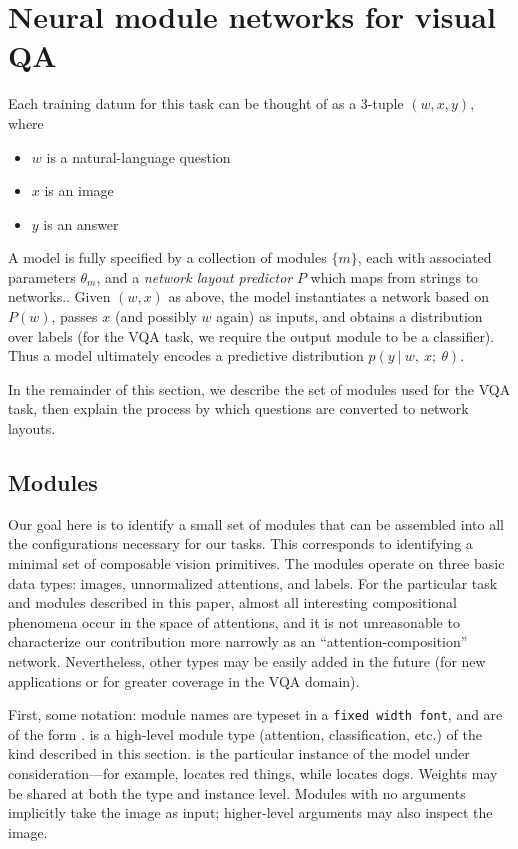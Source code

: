 
\section{Neural module networks for visual QA}
\label{sec:model}

Each training datum for this task can be thought of as a 3-tuple $(w, x, y)$, where
\begin{itemize}
  \setlength\itemsep{0em}
  \item $w$ is a natural-language question
  \item $x$ is an image
  \item $y$ is an answer
\end{itemize}
A model is fully specified by a collection of modules $\{ m \}$, each with
associated parameters $\theta_m$, and a \emph{network layout predictor} $P$
which maps from strings to networks.. Given $(w, x)$ as above, the model
instantiates a network based on $P(w)$, passes $x$ (and possibly $w$ again) as
inputs, and obtains a distribution over labels (for the VQA task, we require the
output module to be a classifier). Thus a model ultimately encodes a predictive
distribution $p(y\ |\ w,\ x;\ \theta)$.

In the remainder of this section, we describe the set of modules used for the
VQA task, then explain the process by which questions are converted to network
layouts.

\subsection{Modules}

Our goal here is to identify a small set of modules that can be assembled into
all the configurations necessary for our tasks. This corresponds to identifying
a minimal set of composable vision primitives. The modules operate on three
basic data types: images, unnormalized attentions, and labels.  For the
particular task and modules described in this paper, almost all interesting
compositional phenomena occur in the space of attentions, and it is not
unreasonable to characterize our contribution more narrowly as an
``attention-composition'' network. Nevertheless, other types may be easily added
in the future (for new applications or for greater coverage in the VQA domain).

First, some notation: module names are typeset in a {\tt fixed width font}, and
are of the form .  is a
high-level module type (attention, classification, etc.) of the kind described
in this section.  is the particular instance of the model under
consideration---for example,  locates red things, while
 locates dogs. Weights may be shared at both the type and
instance level. Modules with no arguments implicitly take the image as input;
higher-level arguments may also inspect the image.

